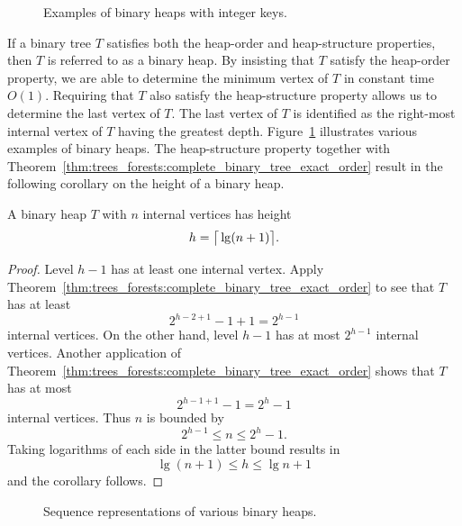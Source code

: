 \begin{figure}[!htbp]
\centering

\caption{Examples of binary heaps with integer keys.}
\label{fig:tree_data_structures:binary_heaps_integer_keys}
\end{figure}

If a binary tree $T$ satisfies both the heap-order and heap-structure
properties, then $T$ is referred to as a binary heap. By insisting
that $T$ satisfy the heap-order property,
we are able to determine the minimum vertex of $T$ in constant time
$O(1)$. Requiring that $T$ also satisfy the
heap-structure property allows us to
determine the last vertex of $T$. The last vertex of $T$ is identified
as the right-most internal vertex of $T$ having the greatest depth.
Figure~\ref{fig:tree_data_structures:binary_heaps_integer_keys}
illustrates various examples of binary heaps. The heap-structure
property together with
Theorem~\ref{thm:trees_forests:complete_binary_tree_exact_order}
result in the following corollary on the height of a binary heap.

\begin{corollary}
\label{cor:tree_data_structures:height_binary_heap}
A binary heap $T$ with $n$ internal vertices has height
\[
h
=
\big\lceil \lg(n + 1) \big\rceil.\index{$\lg$}
\]
\end{corollary}

\begin{proof}
Level $h - 1$ has at least one internal vertex. Apply
Theorem~\ref{thm:trees_forests:complete_binary_tree_exact_order} to
see that $T$ has at least
\[
2^{h - 2 + 1} - 1 + 1
=
2^{h - 1}
\]
internal vertices. On the other hand, level $h - 1$ has at most
$2^{h-1}$ internal vertices. Another application of
Theorem~\ref{thm:trees_forests:complete_binary_tree_exact_order} shows
that $T$ has at most
\[
2^{h - 1 + 1} - 1
=
2^h - 1
\]
internal vertices. Thus $n$ is bounded by
\[
2^{h - 1} \leq n \leq 2^h - 1.
\]
Taking logarithms of each side in the latter bound results in
\[
\lg(n + 1) \leq h \leq \lg n + 1
\]
and the corollary follows.
\end{proof}

\begin{figure}[!htbp]
\centering

\caption{Sequence representations of various binary heaps.}
\label{fig:tree_data_structures:sequence_representations_binary_heaps}
\end{figure}


